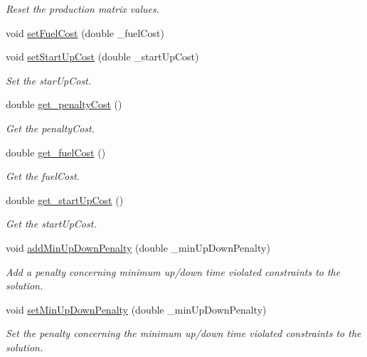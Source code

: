 \begin{DoxyCompactItemize}
\begin{DoxyCompactList}\small\item\em \-Reset the production matrix values. \end{DoxyCompactList}\item 
void \hyperlink{classeo_u_c_p_aedf411ef986fdcbfb7aaa7140363b55d}{set\-Fuel\-Cost} (double \-\_\-fuel\-Cost)
\item 
void \hyperlink{classeo_u_c_p_a9757e9afb8bf1bd9a7becabecead2ad0}{set\-Start\-Up\-Cost} (double \-\_\-start\-Up\-Cost)
\begin{DoxyCompactList}\small\item\em \-Set the star\-Up\-Cost. \end{DoxyCompactList}\item 
double \hyperlink{classeo_u_c_p_ac8a8e2d9019b26766a036e703df76975}{get\-\_\-penalty\-Cost} ()
\begin{DoxyCompactList}\small\item\em \-Get the penalty\-Cost. \end{DoxyCompactList}\item 
double \hyperlink{classeo_u_c_p_ac9959160724db6b80199b331d0020a51}{get\-\_\-fuel\-Cost} ()
\begin{DoxyCompactList}\small\item\em \-Get the fuel\-Cost. \end{DoxyCompactList}\item 
double \hyperlink{classeo_u_c_p_aab5e195c97bf5b997c32f030ba7a704e}{get\-\_\-start\-Up\-Cost} ()
\begin{DoxyCompactList}\small\item\em \-Get the start\-Up\-Cost. \end{DoxyCompactList}\item 
void \hyperlink{classeo_u_c_p_a7a631491d2ed6c3b1e257976f13f137f}{add\-Min\-Up\-Down\-Penalty} (double \-\_\-min\-Up\-Down\-Penalty)
\begin{DoxyCompactList}\small\item\em \-Add a penalty concerning minimum up/down time violated constraints to the solution. \end{DoxyCompactList}\item 
void \hyperlink{classeo_u_c_p_a47e86f80c60f55d851f08eb7b689a741}{set\-Min\-Up\-Down\-Penalty} (double \-\_\-min\-Up\-Down\-Penalty)
\begin{DoxyCompactList}\small\item\em \-Set the penalty concerning the minimum up/down time violated constraints to the solution. \end{DoxyCompactList}\item 

\end{DoxyCompactItemize}
